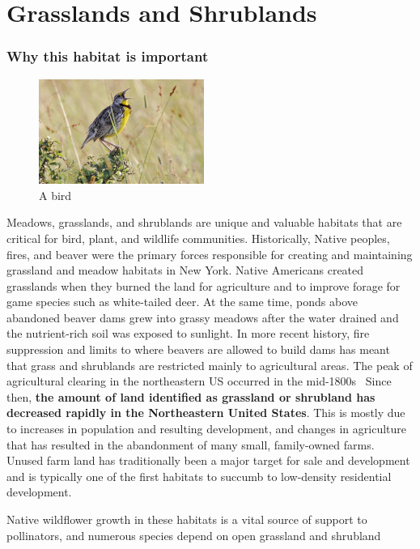 \chapter{Grasslands and Shrublands}\label{subsec:grasslandsandshrublands}
\subsection*{Why this habitat is important}
\begin{figure}
    \includegraphics[width=0.48\textwidth]{images/bird.jpg}
  \caption{A bird}
\end{figure}
Meadows, grasslands, and shrublands are unique and valuable habitats that are
critical for bird, plant, and wildlife communities. Historically, Native
peoples, fires, and beaver were the primary forces responsible for creating and
maintaining grassland and meadow habitats in New York. Native Americans created
grasslands when they burned the land for agriculture and to improve forage for
game species such as white-tailed deer. At the same time, ponds above abandoned
beaver dams grew into grassy meadows after the water drained and the
nutrient-rich soil was exposed to sunlight. In more recent history, fire
suppression and limits to where beavers are allowed to build dams has meant
that grass and shrublands are restricted mainly to agricultural areas. The peak
of agricultural clearing in the northeastern US occurred in the
mid-1800s~\citep{unhextension} Since then, \textbf{the amount of land
identified as grassland or shrubland has decreased rapidly in the
Northeastern United States}. This is mostly due to increases in population and
resulting development, and changes in agriculture that has resulted in the
abandonment of many small, family-owned farms. Unused farm land has
traditionally been a major target for sale and development and is typically one
of the first habitats to succumb to low-density residential development.
\par
Native wildflower growth in these habitats is a vital source of support to
pollinators, and numerous species depend on open grassland and shrubland
